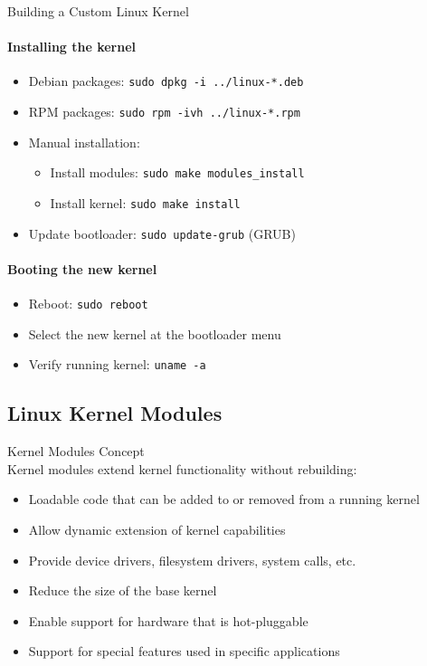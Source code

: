 \begin{KR}{Building a Custom Linux Kernel}
    \paragraph{Installing the kernel}
    \begin{itemize}
        \item Debian packages: \texttt{sudo dpkg -i ../linux-*.deb}
        \item RPM packages: \texttt{sudo rpm -ivh ../linux-*.rpm}
        \item Manual installation:
            \begin{itemize}
                \item Install modules: \texttt{sudo make modules\_install}
                \item Install kernel: \texttt{sudo make install}
            \end{itemize}
        \item Update bootloader: \texttt{sudo update-grub} (GRUB)
    \end{itemize}
    
    \paragraph{Booting the new kernel}
    \begin{itemize}
        \item Reboot: \texttt{sudo reboot}
        \item Select the new kernel at the bootloader menu
        \item Verify running kernel: \texttt{uname -a}
    \end{itemize}
\end{KR}

\subsection{Linux Kernel Modules}

\begin{definition}{Kernel Modules Concept}\\
    Kernel modules extend kernel functionality without rebuilding:
    \begin{itemize}
        \item Loadable code that can be added to or removed from a running kernel
        \item Allow dynamic extension of kernel capabilities
        \item Provide device drivers, filesystem drivers, system calls, etc.
        \item Reduce the size of the base kernel
        \item Enable support for hardware that is hot-pluggable
        \item Support for special features used in specific applications
    \end{itemize}
\end{definition}

